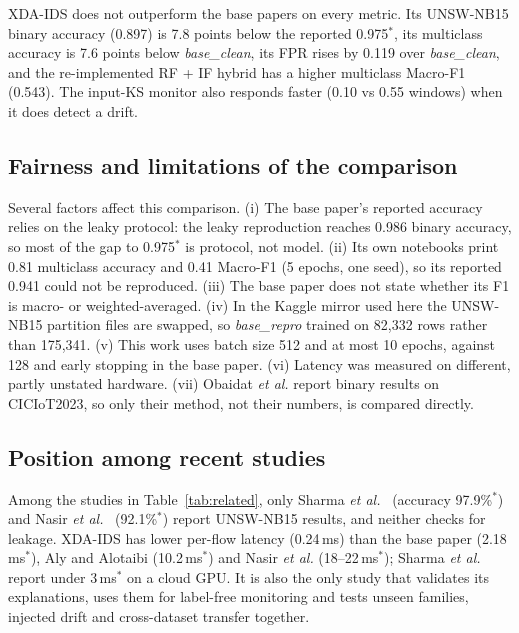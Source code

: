 \documentclass[pdflatex,sn-mathphys-num]{sn-jnl}%
\begin{document}
XDA-IDS does not outperform the base papers on every metric. Its UNSW-NB15 binary accuracy (0.897) is 7.8 points below the reported 0.975$^{*}$, its multiclass accuracy is 7.6 points below \textit{base\_clean}, its FPR rises by 0.119 over \textit{base\_clean}, and the re-implemented RF + IF hybrid has a higher multiclass Macro-F1 (0.543). The input-KS monitor also responds faster (0.10 vs 0.55 windows) when it does detect a drift.

\subsection{Fairness and limitations of the comparison}\label{subsec:fair}
Several factors affect this comparison. (i) The base paper's reported accuracy relies on the leaky protocol: the leaky reproduction reaches 0.986 binary accuracy, so most of the gap to 0.975$^{*}$ is protocol, not model. (ii) Its own notebooks print 0.81 multiclass accuracy and 0.41 Macro-F1 (5 epochs, one seed), so its reported 0.941 could not be reproduced. (iii) The base paper does not state whether its F1 is macro- or weighted-averaged. (iv) In the Kaggle mirror used here the UNSW-NB15 partition files are swapped, so \textit{base\_repro} trained on 82{,}332 rows rather than 175{,}341. (v) This work uses batch size 512 and at most 10 epochs, against 128 and early stopping in the base paper. (vi) Latency was measured on different, partly unstated hardware. (vii) Obaidat \textit{et al.} report binary results on CICIoT2023, so only their method, not their numbers, is compared directly.

\subsection{Position among recent studies}
Among the studies in Table~\ref{tab:related}, only Sharma \textit{et al.}~\cite{sharma2025} (accuracy 97.9\%$^{*}$) and Nasir \textit{et al.}~\cite{nasir2026} (92.1\%$^{*}$) report UNSW-NB15 results, and neither checks for leakage. XDA-IDS has lower per-flow latency (0.24\,ms) than the base paper (2.18\,ms$^{*}$), Aly and Alotaibi (10.2\,ms$^{*}$) and Nasir \textit{et al.} (18--22\,ms$^{*}$); Sharma \textit{et al.} report under 3\,ms$^{*}$ on a cloud GPU. It is also the only study that validates its explanations, uses them for label-free monitoring and tests unseen families, injected drift and cross-dataset transfer together.

\end{document}
